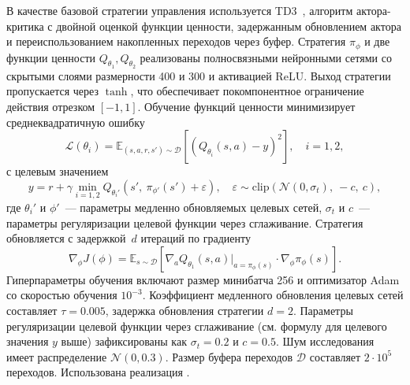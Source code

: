 \documentclass[11pt]{article}
\begin{document}
В качестве базовой стратегии управления используется TD3~\cite{fujimoto2018td3}, алгоритм актора-критика с двойной оценкой функции ценности, задержанным обновлением актора и переиспользованием накопленных переходов через буфер. Стратегия $\pi_\phi$ и две функции ценности $Q_{\theta_1}, Q_{\theta_2}$ реализованы полносвязными нейронными сетями со скрытыми слоями размерности 400 и 300 и активацией ReLU. Выход стратегии пропускается через $\tanh$, что обеспечивает покомпонентное ограничение действия отрезком $[-1, 1]$. Обучение функций ценности минимизирует среднеквадратичную ошибку
\begin{equation}
\mathcal{L}(\theta_i) = \mathbb{E}_{(s, a, r, s') \sim \mathcal{D}}\left[ \left( Q_{\theta_i}(s, a) - y \right)^2 \right],\quad i = 1, 2,
\end{equation}
с целевым значением
\begin{equation}
y = r + \gamma \min_{i=1,2} Q_{\theta_i'}\left( s',\ \pi_{\phi'}(s') + \varepsilon \right),\quad \varepsilon \sim \mathrm{clip}(\mathcal{N}(0, \sigma_t),\ -c,\ c),
\end{equation}
где $\theta_i'$ и $\phi'$~--- параметры медленно обновляемых целевых сетей, $\sigma_t$ и $c$~--- параметры регуляризации целевой функции через сглаживание. Стратегия обновляется с задержкой~$d$ итераций по градиенту
\begin{equation}
\nabla_\phi J(\phi) = \mathbb{E}_{s \sim \mathcal{D}} \left[ \nabla_a Q_{\theta_1}(s, a) \big|_{a = \pi_\phi(s)} \cdot \nabla_\phi \pi_\phi(s) \right].
\end{equation}
Гиперпараметры обучения включают размер минибатча 256 и оптимизатор Adam со скоростью обучения $10^{-3}$. Коэффициент медленного обновления целевых сетей составляет $\tau = 0.005$, задержка обновления стратегии $d = 2$. Параметры регуляризации целевой функции через сглаживание (см. формулу для целевого значения $y$ выше) зафиксированы как $\sigma_t = 0.2$ и $c = 0.5$. Шум исследования имеет распределение $\mathcal{N}(0, 0.3)$. Размер буфера переходов $\mathcal{D}$ составляет $2 \cdot 10^5$ переходов. Использована реализация \cite{raffin2021sb3}.
\end{document}
